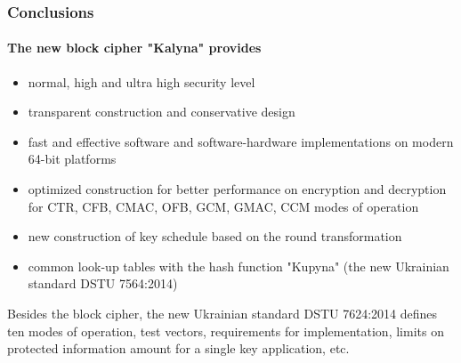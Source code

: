 \documentclass[12pt,mathserif]{beamer}
\begin{document}
	\begin{frame}
		\frametitle {Conclusions}
		\framesubtitle {	The new block cipher "Kalyna" provides}
		
		\begin{itemize}
			\item normal, high and ultra high security level
			\item transparent construction and conservative design
			\item fast and effective software and software-hardware implementations on modern 64-bit platforms
			\item optimized construction for better performance on encryption and
decryption for CTR, CFB, CMAC, OFB, GCM, GMAC, CCM modes of operation 
			\item new construction of key schedule based on the round
transformation
			\item common look-up tables with the hash
function "Kupyna" (the new Ukrainian standard DSTU 7564:2014)
		\end{itemize}
		
		\begin{scriptsize}
			\begin{spacing}{0.5}
			Besides the block cipher, the new Ukrainian standard DSTU 7624:2014 defines ten modes of operation, test vectors, requirements for implementation, limits on protected information amount for a single key application, etc.	
			\end{spacing}
		\end{scriptsize}
	\end{frame}

	
 
\end{document}
